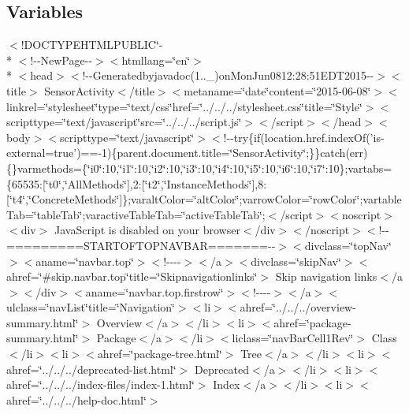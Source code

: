 \subsection*{Variables}
\begin{DoxyCompactItemize}
\item 
$<$!D\-O\-C\-T\-Y\-P\-E\-H\-T\-M\-L\-P\-U\-B\-L\-I\-C\char`\"{}-\/\\*
$<$!-\/-\/New\-Page-\/-\/$>$$<$htmllang=\char`\"{}en\char`\"{}$>$\\*
$<$head$>$$<$!-\/-\/Generatedbyjavadoc(1..\-\_)on\-Mon\-Jun0812\-:28\-:51\-E\-D\-T2015-\/-\/$>$$<$title$>$ Sensor\-Activity$<$/title$>$$<$metaname=\char`\"{}date\char`\"{}content=\char`\"{}2015-\/06-\/08\char`\"{}$>$$<$linkrel=\char`\"{}stylesheet\char`\"{}type=\char`\"{}text/css\char`\"{}href=\char`\"{}../../../stylesheet.\-css\char`\"{}title=\char`\"{}\-Style\char`\"{}$>$$<$scripttype=\char`\"{}text/javascript\char`\"{}src=\char`\"{}../../../script.\-js\char`\"{}$>$$<$/script$>$$<$/head$>$$<$body$>$$<$scripttype=\char`\"{}text/javascript\char`\"{}$>$$<$!-\/-\/try\{if(location.\-href.\-index\-Of('is-\/external=true')==-\/1)\{parent.\-document.\-title=\char`\"{}\-Sensor\-Activity\char`\"{};\}\}catch(err)\{\}varmethods=\{\char`\"{}i0\char`\"{}\-:10,\char`\"{}i1\char`\"{}\-:10,\char`\"{}i2\char`\"{}\-:10,\char`\"{}i3\char`\"{}\-:10,\char`\"{}i4\char`\"{}\-:10,\char`\"{}i5\char`\"{}\-:10,\char`\"{}i6\char`\"{}\-:10,\char`\"{}i7\char`\"{}\-:10\};vartabs=\{65535\-:\mbox{[}\char`\"{}t0\char`\"{},\char`\"{}\-All\-Methods\char`\"{}\mbox{]},2\-:\mbox{[}\char`\"{}t2\char`\"{},\char`\"{}\-Instance\-Methods\char`\"{}\mbox{]},8\-:\mbox{[}\char`\"{}t4\char`\"{},\char`\"{}\-Concrete\-Methods\char`\"{}\mbox{]}\};varalt\-Color=\char`\"{}alt\-Color\char`\"{};varrow\-Color=\char`\"{}row\-Color\char`\"{};vartable\-Tab=\char`\"{}table\-Tab\char`\"{};varactive\-Table\-Tab=\char`\"{}active\-Table\-Tab\char`\"{};$<$/script$>$$<$noscript$>$$<$div$>$ Java\-Script is disabled on your browser$<$/div$>$$<$/noscript$>$$<$!-\/-\/=========\-S\-T\-A\-R\-T\-O\-F\-T\-O\-P\-N\-A\-V\-B\-A\-R=======-\/-\/$>$$<$divclass=\char`\"{}top\-Nav\char`\"{}$>$$<$aname=\char`\"{}navbar.\-top\char`\"{}$>$$<$!-\/-\/-\/-\/$>$$<$/a$>$$<$divclass=\char`\"{}skip\-Nav\char`\"{}$>$$<$ahref=\char`\"{}\#skip.\-navbar.\-top\char`\"{}title=\char`\"{}\-Skipnavigationlinks\char`\"{}$>$ Skip navigation links$<$/a$>$$<$/div$>$$<$aname=\char`\"{}navbar.\-top.\-firstrow\char`\"{}$>$$<$!-\/-\/-\/-\/$>$$<$/a$>$$<$ulclass=\char`\"{}nav\-List\char`\"{}title=\char`\"{}\-Navigation\char`\"{}$>$$<$li$>$$<$ahref=\char`\"{}../../../overview-\/summary.\-html\char`\"{}$>$ Overview$<$/a$>$$<$/li$>$$<$li$>$$<$ahref=\char`\"{}package-\/summary.\-html\char`\"{}$>$ Package$<$/a$>$$<$/li$>$$<$liclass=\char`\"{}nav\-Bar\-Cell1\-Rev\char`\"{}$>$ Class$<$/li$>$$<$li$>$$<$ahref=\char`\"{}package-\/tree.\-html\char`\"{}$>$ Tree$<$/a$>$$<$/li$>$$<$li$>$$<$ahref=\char`\"{}../../../deprecated-\/list.\-html\char`\"{}$>$ Deprecated$<$/a$>$$<$/li$>$$<$li$>$$<$ahref=\char`\"{}../../../index-\/files/index-\/1.\-html\char`\"{}$>$ Index$<$/a$>$$<$/li$>$$<$li$>$$<$ahref=\char`\"{}../../../help-\/doc.\-html\char`\"{}$>$ $$
\end{DoxyCompactItemize}
